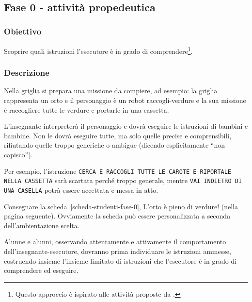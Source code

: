 \subsection{Fase 0 - attività propedeutica }\label{fase-0---attivituxe0-propedeutica}

\ruoliattivita{\ruoloProgrammatore}

\subsubsection{Obiettivo}\label{obiettivo-1}

Scoprire quali istruzioni l'esecutore è in grado di comprendere\footnote{
  Questo approccio è ispirato alle attività proposte da \textcite{lodi-etal-2020}.
  }.

\subsubsection{Descrizione}

\noindent\begin{minipage}[c]{.80\linewidth}
Nella griglia si prepara una missione da compiere, ad esempio: la griglia rappresenta un orto e il personaggio è un robot raccogli-verdure e la sua missione è raccogliere tutte le verdure e portarle in una cassetta.
\end{minipage}\hfill
\begin{minipage}[c]{.16\linewidth}
\centering
{}
\end{minipage}\par

L'insegnante interpreterà il personaggio e dovrà eseguire le istruzioni di bambini e bambine. Non le dovrà eseguire tutte, ma solo quelle precise e comprensibili, rifiutando quelle troppo generiche o ambigue (dicendo esplicitamente ``non capisco'').

Per esempio, l'istruzione \texttt{CERCA E RACCOGLI TUTTE LE CAROTE E RIPORTALE NELLA CASSETTA} sarà scartata perché troppo generale, mentre \texttt{VAI INDIETRO DI UNA CASELLA} potrà essere accettata e messa in atto.

Consegnare la scheda~\ref{scheda-studenti-fase-0}, L'orto è pieno di verdure! (nella pagina seguente). Ovviamente la scheda può essere personalizzata a seconda dell'ambientazione scelta.

Alunne e alunni, osservando attentamente e attivamente il comportamento dell'insegnante-esecutore, dovranno prima individuare le istruzioni ammesse, costruendo insieme l'insieme limitato di istruzioni che l'esecutore è in grado di comprendere ed eseguire.


